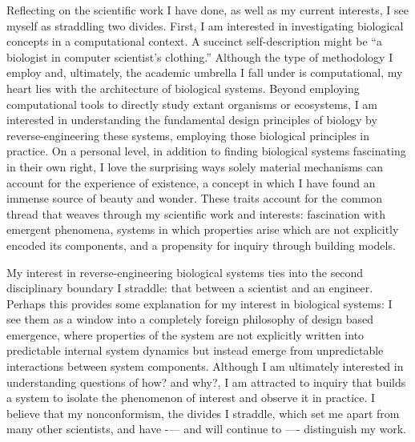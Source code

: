 \documentclass[12pt]{book}
\begin{document}
\maketitle


Reflecting on the scientific work I have done, as well as my current interests, I see myself as straddling two divides. First, I am interested in investigating biological concepts in a computational context. A succinct self-description might be “a biologist in computer scientist’s clothing.”  Although the type of methodology I employ and, ultimately, the academic umbrella I fall under is computational, my heart lies with the architecture of biological systems. Beyond employing computational tools to directly study extant organisms or ecosystems, I am interested in understanding the fundamental design principles of biology by reverse-engineering these systems, employing those biological principles in practice. On a personal level, in addition to finding biological systems fascinating in their own right, I love the surprising ways solely material mechanisms can account for the experience of existence, a concept in which I have found an immense source of beauty and wonder. These traits account for the common thread that weaves through my scientific work and interests: fascination with emergent phenomena, systems in which properties arise which are not explicitly encoded its components, and a propensity for inquiry through building models.

My interest in reverse-engineering biological systems ties into the second disciplinary boundary I straddle: that between a scientist and an engineer. Perhaps this provides some explanation for my interest in biological systems: I see them as a window into a completely foreign philosophy of design based emergence, where properties of the system are not explicitly written into predictable internal system dynamics but instead emerge from unpredictable interactions between system components. Although I am ultimately interested in understanding questions of how? and why?, I am attracted to inquiry that builds a system to isolate the phenomenon of interest and observe it in practice. I believe that my nonconformism, the divides I straddle, which set me apart from many other scientists, and have -— and will continue to —- distinguish my work.
\end{document}
